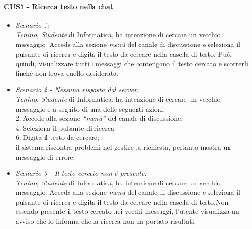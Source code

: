 \paragraph{CUS7 - Ricerca testo nella chat\\}
\begin{itemize}
	\item \textit{Scenario 1:\\}
	\textit{Tonino}, \textit{Studente} di Informatica, ha intenzione di cercare un vecchio messaggio. Accede alla sezione \textit{menù} del canale di discussione e seleziona il pulsante di ricerca e digita il testo da cercare nella casella di testo. 
	Può, quindi, visualizzare tutti i messaggi che contengono il testo cercato e scorrerli finchè non trova quello desiderato.\\
	
	\item \textit{Scenario 2 - Nessuna risposta dal server:\\}
	\textit{Tonino}, \textit{Studente} di Informatica, ha intenzione di cercare un vecchio messaggio e a seguito di una delle seguenti azioni:\\
	2. Accede alla sezione \textit{“menù”} del canale di discussione;\\
	4. Seleziona il pulsante di ricerca;\\
	6. Digita il testo da cercare;\\
	il sistema riscontra problemi nel gestire la richiesta, pertanto mostra un messaggio di errore.\\
	
	\item \textit{Scenario 3 - Il testo cercato non é presente:\\}
	\textit{Tonino}, \textit{Studente} di Informatica, ha intenzione di cercare un vecchio messaggio. Accede alla sezione \textit{menù} del canale di discussione e seleziona il pulsante di ricerca e digita il testo da cercare nella casella di testo.Non essendo presente il testo cercato nei vecchi messaggi, l’utente visualizza un avviso che lo informa che la ricerca non ha portato risultati.\\
	
\end{itemize}


